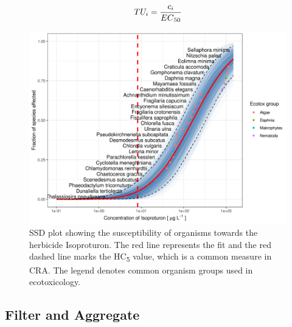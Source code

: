 \begin{equation}
    TU_i = \frac{c_i}{EC\textsubscript{50}}
    \label{eq:tu}
\end{equation}

\begin{figure}[h!]
    \dentering
    \includegraphics[width=1\linewidth]{article/figures/ssd2_boot.png}
    \caption{SSD plot showing the susceptibility of organisms towards the herbicide Isoproturon. The red line represents the fit and the red dashed line marks the HC\textsubscript{5} value, which is a common measure in CRA. The legend denotes common organism groups used in ecotoxicology.}
    \label{fig:ssd-isoproturon}
\end{figure}

\subsection*{Filter and Aggregate}

